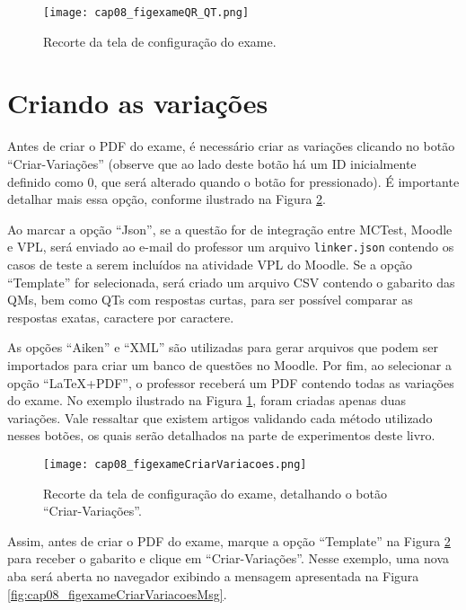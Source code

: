 \begin{figure}[!ht]
  \centering
  \texttt{[image: cap08\_figexameQR\_QT.png]}
   \caption{Recorte da tela de configuração do exame.}
\label{fig:cap08_figexameQR_QT}
\end{figure}

\section{Criando as variações}

Antes de criar o PDF do exame, é necessário criar as variações clicando no botão ``Criar-Variações'' (observe que ao lado deste botão há um ID inicialmente definido como 0, que será alterado quando o botão for pressionado). É importante detalhar mais essa opção, conforme ilustrado na Figura \ref{fig:cap08_figexameCriarVariacoes}.

Ao marcar a opção ``Json'', se a questão for de integração entre MCTest, Moodle e VPL, será enviado ao e-mail do professor um arquivo \verb|linker.json| contendo os casos de teste a serem incluídos na atividade VPL do Moodle. Se a opção ``Template'' for selecionada, será criado um arquivo CSV contendo o gabarito das QMs, bem como QTs com respostas curtas, para ser possível comparar as respostas exatas, caractere por caractere.

As opções ``Aiken'' e ``XML'' são utilizadas para gerar arquivos que podem ser importados para criar um banco de questões no Moodle. Por fim, ao selecionar a opção ``LaTeX+PDF'', o professor receberá um PDF contendo todas as variações do exame. No exemplo ilustrado na Figura \ref{fig:cap08_figexameQR_QT}, foram criadas apenas duas variações. Vale ressaltar que existem artigos validando cada método utilizado nesses botões, os quais serão detalhados na parte de experimentos deste livro.

\begin{figure}[!ht]
  \centering
  \texttt{[image: cap08\_figexameCriarVariacoes.png]}
   \caption{Recorte da tela de configuração do exame, detalhando o botão ``Criar-Variações''.}
\label{fig:cap08_figexameCriarVariacoes}
\end{figure}

Assim, antes de criar o PDF do exame, marque a opção ``Template'' na Figura \ref{fig:cap08_figexameCriarVariacoes} para receber o gabarito e clique em ``Criar-Variações''. Nesse exemplo, uma nova aba será aberta no navegador exibindo a mensagem apresentada na Figura \ref{fig:cap08_figexameCriarVariacoesMsg}. 

